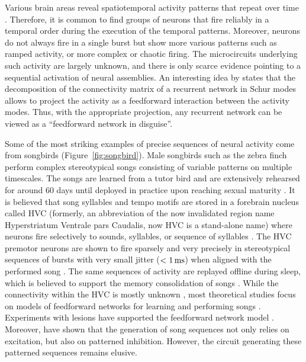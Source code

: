     Various brain areas reveal spatiotemporal activity patterns that repeat
    over time \cite[e.g.,][]{Wilson1994, Kenet2003, Berkes2011}. Therefore, it
    is common to find groups of neurons that fire reliably in a temporal order
    during the execution of the temporal patterns. Moreover, neurons do not
    always fire in a single burst but show more various patterns such as ramped
    activity, or more complex or chaotic firing. The microcircuits
    underlying such activity are largely unknown, and there is only scarce
    evidence pointing to a sequential activation of neural assemblies. An
    interesting idea by \cite{Goldman2009} states that the decomposition of the
    connectivity matrix of a recurrent network in Schur modes allows to project
    the activity as a feedforward interaction between the activity modes. Thus,
    with the appropriate projection, any recurrent network can be viewed as a
    ``feedforward network in disguise''.

    Some of the most striking examples of precise sequences of neural activity
    come from songbirds (Figure~\ref{fig:songbird}). Male songbirds such as the zebra finch perform complex
    stereotypical songs consisting of variable patterns on multiple timescales.
    The songs are learned from a tutor bird and are extensively rehearsed for
    around 60 days until deployed in practice upon reaching sexual maturity
    \citep{George1995, Doupe2004}. It is believed that song syllables and tempo
    motifs are stored in a forebrain nucleus called HVC (formerly, an
    abbreviation of the now invalidated region name Hyperstriatum Ventrale pars
    Caudalis, now HVC is a stand-alone name) where neurons fire
    selectively to sounds, syllables, or sequence of syllables \citep{Yu1996}.
    The HVC premotor neurons are shown to fire sparsely and very precisely in
    stereotypical sequences of bursts with very small jitter ($<1\,\rm ms$)
    when aligned with the performed song \citep{Hahnloser2002}. The same
    sequences of activity are replayed offline during sleep, which is believed
    to support the memory consolidation of songs \citep{Dave2000}. While the
    connectivity within the HVC is mostly unknown \citep{Hamaguchi2012,
    Poole2012}, most theoretical studies focus on models of feedforward
    networks for learning and performing songs \citep[e.g.,][]{Li2006,
    Long2010, Hanuschkin2011}. Experiments with lesions have supported the
    feedforward network model \citep{Poole2012}. Moreover, \cite{Kosche2015}
    have shown that the generation of song sequences not only relies on
    excitation, but also on patterned inhibition. However, the circuit generating these
    patterned sequences remains elusive.  

